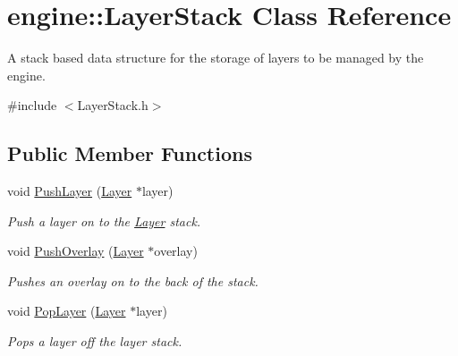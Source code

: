 \hypertarget{classengine_1_1LayerStack}{}\section{engine\+:\+:Layer\+Stack Class Reference}
\label{classengine_1_1LayerStack}


A stack based data structure for the storage of layers to be managed by the engine.  




{\ttfamily \#include $<$Layer\+Stack.\+h$>$}

\subsection*{Public Member Functions}
\begin{DoxyCompactItemize}
\item 
\mbox{\label{classengine_1_1LayerStack_a0af3e9ae8559e5321312834061d45ff2}} 
void \hyperlink{classengine_1_1LayerStack_a0af3e9ae8559e5321312834061d45ff2}{Push\+Layer} (\hyperlink{classengine_1_1Layer}{Layer} $\ast$layer)
\begin{DoxyCompactList}\small\item\em Push a layer on to the \hyperlink{classengine_1_1Layer}{Layer} stack. \end{DoxyCompactList}\item 
\mbox{\label{classengine_1_1LayerStack_a5afd12a6e1912070f4256b43558c2ebd}} 
void \hyperlink{classengine_1_1LayerStack_a5afd12a6e1912070f4256b43558c2ebd}{Push\+Overlay} (\hyperlink{classengine_1_1Layer}{Layer} $\ast$overlay)
\begin{DoxyCompactList}\small\item\em Pushes an overlay on to the back of the stack. \end{DoxyCompactList}\item 
\mbox{\label{classengine_1_1LayerStack_a1308d64db567b107f4e17a274792ee8e}} 
void \hyperlink{classengine_1_1LayerStack_a1308d64db567b107f4e17a274792ee8e}{Pop\+Layer} (\hyperlink{classengine_1_1Layer}{Layer} $\ast$layer)
\begin{DoxyCompactList}\small\item\em Pops a layer off the layer stack. \end{DoxyCompactList}\item 

\end{DoxyCompactItemize}
